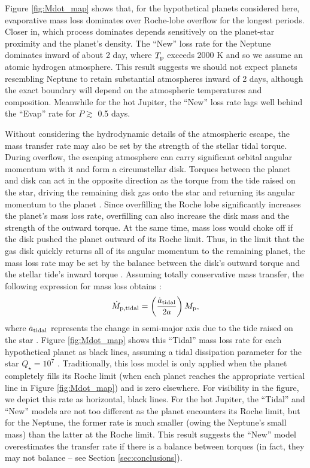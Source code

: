 \documentclass{aastex}
\begin{document}
Figure \ref{fig:Mdot_map} shows that, for the hypothetical planets considered here, evaporative mass loss dominates over Roche-lobe overflow for the longest periods. Closer in, which process dominates depends sensitively on the planet-star proximity and the planet's density. The ``New'' loss rate for the Neptune dominates inward of about 2 day, where $T_{\rm p}$ exceeds 2000 K and so we assume an atomic hydrogen atmosphere. This result suggests we should not expect planets resembling Neptune to retain substantial atmospheres inward of 2 days, although the exact boundary will depend on the atmospheric temperatures and composition. Meanwhile for the hot Jupiter, the ``New'' loss rate lags well behind the ``Evap'' rate for $P \gtrsim$ 0.5 days. 

Without considering the hydrodynamic details of the atmospheric escape, the mass transfer rate may also be set by the strength of the stellar tidal torque. During overflow, the escaping atmosphere can carry significant orbital angular momentum with it and form a circumstellar disk. Torques between the planet and disk can act in the opposite direction as the torque from the tide raised on the star, driving the remaining disk gas onto the star and returning its angular momentum to the planet \citep{1979MNRAS.186..799L}. Since overfilling the Roche lobe significantly increases the planet's mass loss rate, overfilling can also increase the disk mass and the strength of the outward torque. At the same time, mass loss would choke off if the disk pushed the planet outward of its Roche limit. Thus, in the limit that the gas disk quickly returns all of its angular momentum to the remaining planet, the mass loss rate may be set by the balance between the disk's outward torque and the stellar tide's inward torque \citep{1988ApJ...332..193V}. Assuming totally conservative mass transfer, the following expression for mass loss obtains \citep{2015ApJ...813..101V}:
\begin{equation}
\dot{M}_{\rm p, tidal} = \left(\dfrac{\dot{a}_{\rm tidal}}{2 a}\right) M_{\rm p},
\label{eqn:Mdot_tidal}
\end{equation}
where $\dot{a}_{\rm tidal}$ represents the change in semi-major axis due to the tide raised on the star \citep{2008ApJ...678.1396J}. Figure \ref{fig:Mdot_map} shows this ``Tidal'' mass loss rate for each hypothetical planet as black lines, assuming a tidal dissipation parameter for the star $Q_\star = 10^7$ \citep{2012ApJ...751...96P}. Traditionally, this loss model is only applied when the planet completely fills its Roche limit (when each planet reaches the appropriate vertical line in Figure \ref{fig:Mdot_map}) and is zero elsewhere. For visibility in the figure, we depict this rate as horizontal, black lines. For the hot Jupiter, the ``Tidal'' and ``New'' models are not too different as the planet encounters its Roche limit, but for the Neptune, the former rate is much smaller (owing the Neptune's small mass) than the latter at the Roche limit. This result suggests the ``New'' model overestimates the transfer rate if there is a balance between torques (in fact, they may not balance -- see Section \ref{sec:conclusions}).
\end{document}
